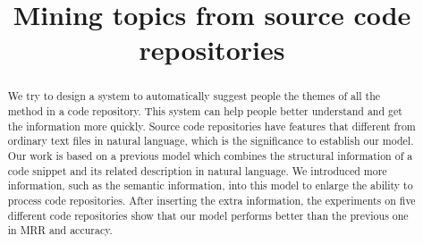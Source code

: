 \documentclass[conference]{IEEEtran}
\begin{document}
%
\title{Mining topics from source code repositories}



\maketitle

\begin{abstract}
We try to design a system to automatically suggest people the themes of all the method
in a code repository. This system can help people better understand and get the information
more quickly. Source code repositories have features that different from ordinary text files
in natural language, which is the significance to establish our model.
Our work is based on a previous model which combines the structural information of a code
snippet and its related description in natural language. We introduced more information,
such as the semantic information, into this model to enlarge the ability to process code
repositories. After inserting the extra information, the experiments on five different
code repositories show that our model performs better than the previous one in MRR and accuracy.
\end{abstract}
\end{document}
